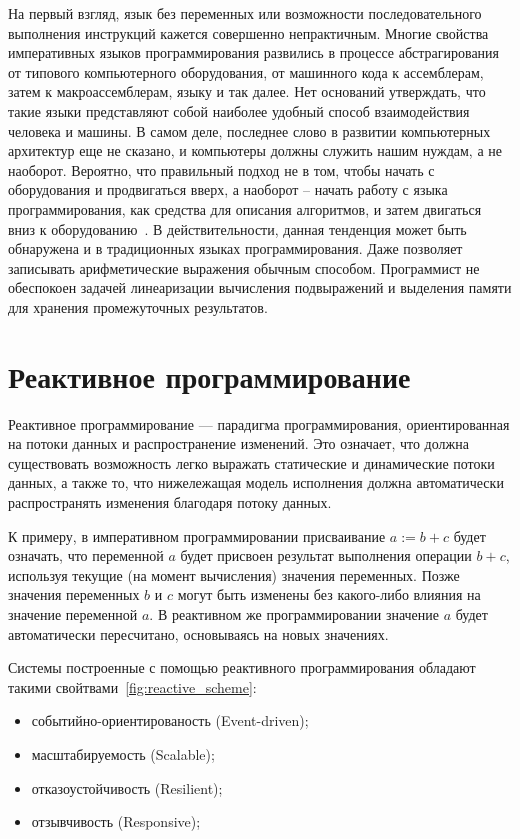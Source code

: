 На первый взгляд, язык без переменных или возможности последовательного выполнения инструкций кажется совершенно непрактичным. Многие свойства императивных языков программирования развились в процессе абстрагирования от типового компьютерного оборудования, от машинного кода к ассемблерам, затем к макроассемблерам, языку \cpp{} и так далее. Нет оснований утверждать, что такие языки представляют собой наиболее удобный способ взаимодействия человека и машины. В самом деле, последнее слово в развитии компьютерных архитектур еще не сказано, и компьютеры должны служить нашим нуждам, а не наоборот. Вероятно, что правильный подход не в том, чтобы начать с оборудования и продвигаться вверх, а наоборот – начать работу с языка программирования, как средства для описания алгоритмов, и затем двигаться вниз к оборудованию~\cite{dijkstra}. В действительности, данная тенденция может быть обнаружена и в традиционных языках программирования. Даже \cpp{} позволяет записывать арифметические выражения обычным способом. Программист не обеспокоен задачей линеаризации вычисления подвыражений и выделения памяти для хранения промежуточных результатов.

\section{Реактивное программирование}
\label{sub:domain:reactive_programming}

Реактивное программирование --- парадигма программирования, ориентированная на потоки данных и распространение изменений. Это означает, что должна существовать возможность легко выражать статические и динамические потоки данных, а также то, что нижележащая модель исполнения должна автоматически распространять изменения благодаря потоку данных.

К примеру, в императивном программировании присваивание $a := b + c$ будет означать, что переменной $a$ будет присвоен результат выполнения операции $b + c$, используя текущие (на момент вычисления) значения переменных. Позже значения переменных $b$ и $c$ могут быть изменены без какого-либо влияния на значение переменной $a$. В реактивном же программировании значение $a$ будет автоматически пересчитано, основываясь на новых значениях.

Системы построенные с помощью реактивного программирования обладают такими свойтвами~\ref{fig:reactive_scheme}:

\begin{itemize}
  \item событийно-ориентированость (Event-driven);
  \item масштабируемость (Scalable);
  \item отказоустойчивость (Resilient);
  \item отзывчивость (Responsive);
\end{itemize}

